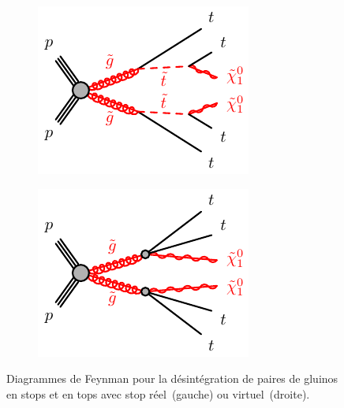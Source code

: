 \begin{figure}[h]
  \centering
  \begin{subfigure}{.5\textwidth}
    \includegraphics[width=\textwidth]{gogo-ttttN1N1-stst.pdf}
    \label{fig:sub1}
  \end{subfigure}%
  \begin{subfigure}{.5\textwidth}
    \includegraphics[width=\textwidth]{gogo-ttttN1N1.pdf}
    \label{fig:sub2}
  \end{subfigure}
  \caption{Diagrammes de Feynman pour la désintégration de paires de gluinos en stops et en tops avec stop
    réel~(gauche) ou virtuel~(droite).}
  \label{fig:susy_feyn}
\end{figure}

